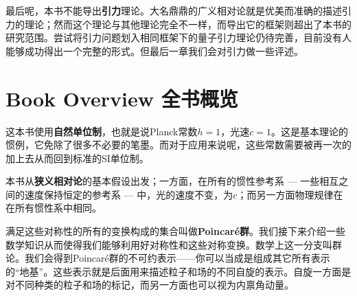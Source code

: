最后呢，本书不能导出{\bf 引力}理论。大名鼎鼎的广义相对论就是优美而准确的描述引力的理论；然而这个理论与其他理论完全不一样，而导出它的框架则超出了本书的研究范围。尝试将引力问题划入相同框架下的量子引力理论仍待完善，目前没有人能够成功得出一个完整的形式。但最后一章我们会对引力做一些评述。

\section[全书概览]{Book Overview 全书概览}\label{sec1.2}

\begin{center}
\end{center}

这本书使用{\bf 自然单位制}，也就是说Planck常数$h = 1$，光速$c=1$。这是基本理论的惯例，它免除了很多不必要的笔墨。而对于应用来说呢，这些常数需要被再一次的加上去从而回到标准的SI单位制。

本书从{\bf 狭义相对论}的基本假设出发；一方面，在所有的惯性参考系 --- 一些相互之间的速度保持恒定的参考系 --- 中，光的速度不变，为$c$；而另一方面物理规律在在所有惯性系中相同。

满足这些对称性的所有的变换构成的集合叫做{\bf Poincaré群}。我们接下来介绍一些数学知识从而使得我们能够利用好对称性和这些对称变换。数学上这一分支叫群论。我们会得到Poincaré群的不可约表示——你可以当成是组成其它所有表示的“地基”。这些表示就是后面用来描述粒子和场的不同自旋的表示。自旋一方面是对不同种类的粒子和场的标记，而另一方面也可以视为内禀角动量。

